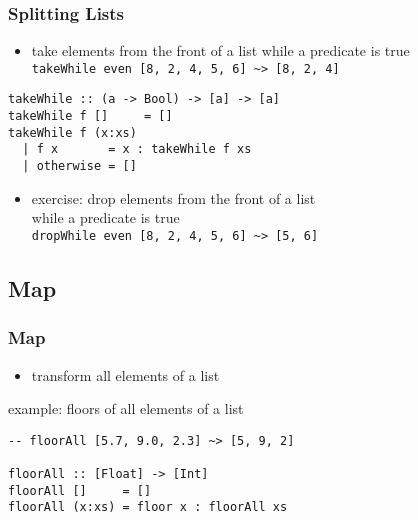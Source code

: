 \documentclass[dvipsnames]{beamer}
\theoremstyle{plain}
\begin{document}
\begin{frame}[fragile]
  \frametitle{Splitting Lists}

  \begin{itemize}
    \item take elements from the front of a list while a predicate is true\\
      \lstinline|takeWhile even [8, 2, 4, 5, 6] ~> [8, 2, 4]|
  \end{itemize}

  \begin{exampleblock}{}
    \begin{lstlisting}[deletekeywords={takeWhile}]
takeWhile :: (a -> Bool) -> [a] -> [a]
takeWhile f []     = []
takeWhile f (x:xs)
  | f x       = x : takeWhile f xs
  | otherwise = []
    \end{lstlisting}
  \end{exampleblock}

  \pause
  \begin{itemize}
    \item exercise: drop elements from the front of a list\\
      while a predicate is true\\
      \lstinline|dropWhile even [8, 2, 4, 5, 6] ~> [5, 6]|
  \end{itemize}
\end{frame}

\subsection{Map}

\begin{frame}[fragile]
  \frametitle{Map}

  \begin{itemize}
    \item transform all elements of a list
  \end{itemize}

  \begin{exampleblock}{example: floors of all elements of a list}
    \begin{lstlisting}
-- floorAll [5.7, 9.0, 2.3] ~> [5, 9, 2]

floorAll :: [Float] -> [Int]
floorAll []     = []
floorAll (x:xs) = floor x : floorAll xs
    \end{lstlisting}
  \end{exampleblock}
\end{frame}
\end{document}
